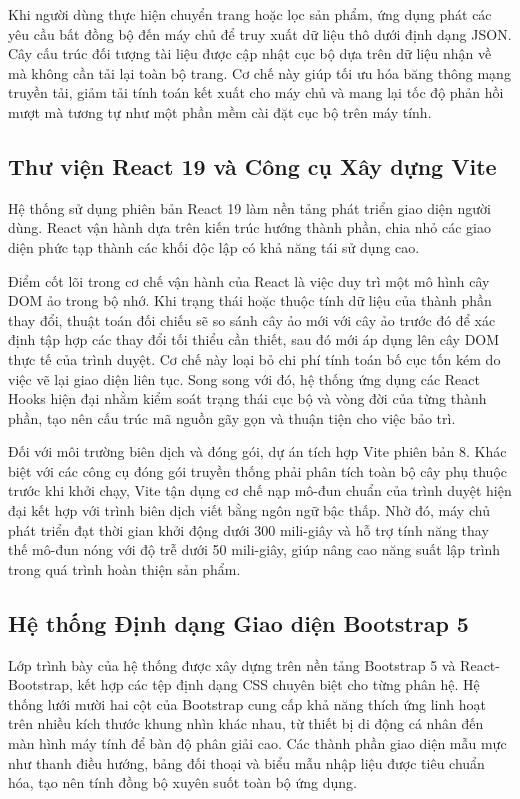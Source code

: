 Khi người dùng thực hiện chuyển trang hoặc lọc sản phẩm, ứng dụng phát các yêu cầu bất đồng bộ đến máy chủ để truy xuất dữ liệu thô dưới định dạng JSON. Cây cấu trúc đối tượng tài liệu được cập nhật cục bộ dựa trên dữ liệu nhận về mà không cần tải lại toàn bộ trang. Cơ chế này giúp tối ưu hóa băng thông mạng truyền tải, giảm tải tính toán kết xuất cho máy chủ và mang lại tốc độ phản hồi mượt mà tương tự như một phần mềm cài đặt cục bộ trên máy tính.

\subsection{Thư viện React 19 và Công cụ Xây dựng Vite}
Hệ thống sử dụng phiên bản React 19 làm nền tảng phát triển giao diện người dùng. React vận hành dựa trên kiến trúc hướng thành phần, chia nhỏ các giao diện phức tạp thành các khối độc lập có khả năng tái sử dụng cao.

Điểm cốt lõi trong cơ chế vận hành của React là việc duy trì một mô hình cây DOM ảo trong bộ nhớ. Khi trạng thái hoặc thuộc tính dữ liệu của thành phần thay đổi, thuật toán đối chiếu sẽ so sánh cây ảo mới với cây ảo trước đó để xác định tập hợp các thay đổi tối thiểu cần thiết, sau đó mới áp dụng lên cây DOM thực tế của trình duyệt. Cơ chế này loại bỏ chi phí tính toán bố cục tốn kém do việc vẽ lại giao diện liên tục. Song song với đó, hệ thống ứng dụng các React Hooks hiện đại nhằm kiểm soát trạng thái cục bộ và vòng đời của từng thành phần, tạo nên cấu trúc mã nguồn gãy gọn và thuận tiện cho việc bảo trì.

Đối với môi trường biên dịch và đóng gói, dự án tích hợp Vite phiên bản 8. Khác biệt với các công cụ đóng gói truyền thống phải phân tích toàn bộ cây phụ thuộc trước khi khởi chạy, Vite tận dụng cơ chế nạp mô-đun chuẩn của trình duyệt hiện đại kết hợp với trình biên dịch viết bằng ngôn ngữ bậc thấp. Nhờ đó, máy chủ phát triển đạt thời gian khởi động dưới 300 mili-giây và hỗ trợ tính năng thay thế mô-đun nóng với độ trễ dưới 50 mili-giây, giúp nâng cao năng suất lập trình trong quá trình hoàn thiện sản phẩm.

\subsection{Hệ thống Định dạng Giao diện Bootstrap 5}
Lớp trình bày của hệ thống được xây dựng trên nền tảng Bootstrap 5 và React-Bootstrap, kết hợp các tệp định dạng CSS chuyên biệt cho từng phân hệ. Hệ thống lưới mười hai cột của Bootstrap cung cấp khả năng thích ứng linh hoạt trên nhiều kích thước khung nhìn khác nhau, từ thiết bị di động cá nhân đến màn hình máy tính để bàn độ phân giải cao. Các thành phần giao diện mẫu mực như thanh điều hướng, bảng đối thoại và biểu mẫu nhập liệu được tiêu chuẩn hóa, tạo nên tính đồng bộ xuyên suốt toàn bộ ứng dụng.

